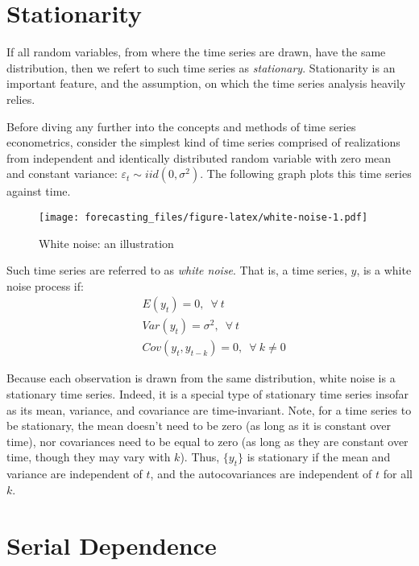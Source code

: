 \documentclass[
  oneside]{book}
\begin{document}
\hypertarget{stationarity}{%
\section{Stationarity}\label{stationarity}}

If all random variables, from where the time series are drawn, have the same distribution, then we refert to such time series as \emph{stationary}. Stationarity is an important feature, and the assumption, on which the time series analysis heavily relies.

Before diving any further into the concepts and methods of time series econometrics, consider the simplest kind of time series comprised of realizations from independent and identically distributed random variable with zero mean and constant variance: \(\varepsilon_t \sim iid\left(0,\sigma^2\right)\). The following graph plots this time series against time.

\begin{figure}
\centering
\texttt{[image: forecasting\_files/figure-latex/white-noise-1.pdf]}
\caption{\label{fig:white-noise}White noise: an illustration}
\end{figure}

Such time series are referred to as \emph{white noise}. That is, a time series, \(y\), is a white noise process if:
\begin{align*}
& E(y_t) = 0,\;~\forall~t\\
& Var(y_t) = \sigma^2,\;~\forall~t\\
& Cov(y_t,y_{t-k}) = 0,\;~\forall~k \ne 0
\end{align*}

Because each observation is drawn from the same distribution, white noise is a stationary time series. Indeed, it is a special type of stationary time series insofar as its mean, variance, and covariance are time-invariant. Note, for a time series to be stationary, the mean doesn't need to be zero (as long as it is constant over time), nor covariances need to be equal to zero (as long as they are constant over time, though they may vary with \(k\)). Thus, \(\{y_t\}\) is stationary if the mean and variance are independent of \(t\), and the autocovariances are independent of \(t\) for all \(k\).

\hypertarget{serial-dependence}{%
\section{Serial Dependence}\label{serial-dependence}}
\end{document}
